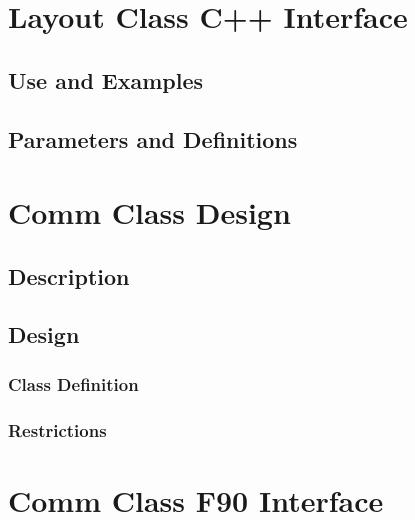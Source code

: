 \documentclass[]{article}
\begin{document}
\section{Layout Class C++ Interface}

\subsection{Use and Examples}




\subsection{Parameters and Definitions}

%







\section{Comm Class Design}

\subsection{Description}




\subsection{Design}




\subsubsection{Class Definition}




\subsubsection{Restrictions}

%


\section{Comm Class F90 Interface}
\end{document}
